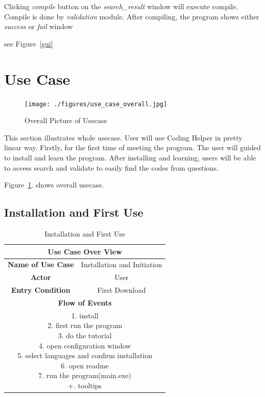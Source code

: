 \documentclass[conference]{IEEEtran}
\begin{document}
Clicking \textit{compile} button on the  \textit{search\_result} window will execute compile.
Compile is done by \textit{validation} module. After compiling, the program shows either \textit{success} or \textit{fail} window


see Figure~\ref{gui}





\section{Use Case} %
\label{sec:use_case}

\begin{figure}[ht]
\centering
\texttt{[image: ./figures/use\_case\_overall.jpg]}
\caption{Overall Picture of Usecase}
\label{fig:usecase}
\end{figure}

This section illustrates whole usecase. User will use Coding Helper in pretty linear way. Firstly, for the first time of meeting the program.
The user will guided to install and learn the program.
After installing and learning, users will be able to access search and validate to easily find the codes from questions.

Figure~\ref{fig:usecase}. shows overall usecase.  

\subsection{Installation and First Use}
\begin{table}[ht]
\renewcommand{\arraystretch}{1}
\caption{Installation and First Use}
\label{table:usecase1}
\centering
\begin{adjustbox}{width=0.3 \textwidth}
\small
\begin{tabular}{c|c}
\hline
\multicolumn{2}{c}{\textbf{Use Case Over View}} \\
\hline
\textbf{Name of Use Case} & Installation and Initiation \\
\hline
\textbf{Actor} & User \\
\hline
\textbf{Entry Condition} & First Download\\
\hline
\multicolumn{2}{c}{\textbf{Flow of Events}}\\
\hline
\multicolumn{2}{c}{
\parbox[t]{5cm}{
  1. install \\
  2. first run the program \\
  3. do the tutorial \\
  4. open configuration window \\
  5. select languages and confirm installation \\
  6. open readme \\
  7. run the program(main.exe) \\
  +. tooltips
  }
}\\
\hline

\end{tabular}
\end{adjustbox}
\end{table}
%
\end{document}
